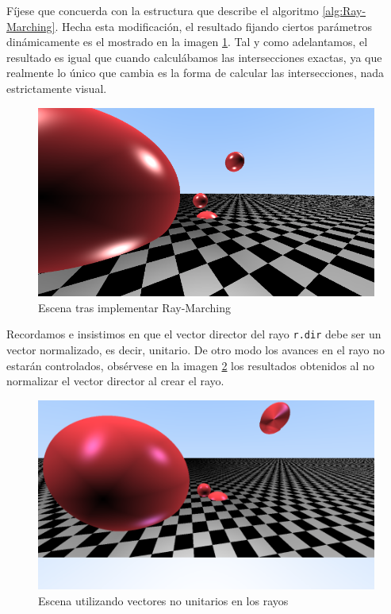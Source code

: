 Fíjese que concuerda con la estructura que describe el algoritmo \ref{alg:Ray-Marching}. Hecha esta modificación, el resultado fijando ciertos parámetros dinámicamente es el mostrado en la imagen \ref{fig:esferas-RM}. Tal y como adelantamos, el resultado es igual que cuando calculábamos las intersecciones exactas, ya que realmente lo único que cambia es la forma de calcular las intersecciones, nada estrictamente visual.

\begin{figure} [ht]
    \centering
    \includegraphics[scale = 0.37]{img/C8/esferas-ray-marching.png}
    \caption{Escena tras implementar Ray-Marching}
    \label{fig:esferas-RM}
\end{figure}

Recordamos e insistimos en que el vector director del rayo \verb|r.dir| debe ser un vector normalizado, es decir, unitario. De otro modo los avances en el rayo no estarán controlados, obsérvese en la imagen \ref{fig:vectores-no-normalizados} los resultados obtenidos al no normalizar el vector director al crear el rayo.

\begin{figure} [ht]
    \centering
    \includegraphics[scale = 0.3]{img/C8/vectores-no-normalizados.png}
    \caption{Escena utilizando vectores no unitarios en los rayos}
    \label{fig:vectores-no-normalizados}
\end{figure}

